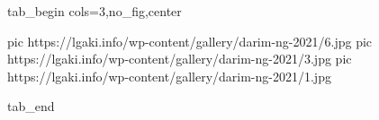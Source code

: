  
 
 
 
 


\ifcmt
  tab_begin cols=3,no_fig,center

     pic https://lgaki.info/wp-content/gallery/darim-ng-2021/6.jpg
		 pic https://lgaki.info/wp-content/gallery/darim-ng-2021/3.jpg
		 pic https://lgaki.info/wp-content/gallery/darim-ng-2021/1.jpg

  tab_end
\fi
